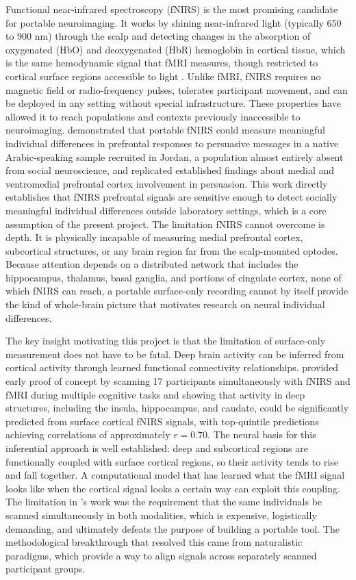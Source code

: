 Functional near-infrared spectroscopy (fNIRS) is the most promising candidate for
portable neuroimaging. It works by shining near-infrared light (typically 650 to 900 nm)
through the scalp and detecting changes in the absorption of oxygenated (HbO) and
deoxygenated (HbR) hemoglobin in cortical tissue, which is the same hemodynamic signal
that fMRI measures, though restricted to cortical surface regions accessible to light
\parencite{kamran2016}. Unlike fMRI, fNIRS requires no magnetic field or
radio-frequency pulses, tolerates participant movement, and can be deployed in any
setting without special infrastructure. These properties have allowed it to reach
populations and contexts previously inaccessible to neuroimaging. \textcite{burns2019}
demonstrated that portable fNIRS could measure meaningful individual differences in
prefrontal responses to persuasive messages in a native Arabic-speaking sample recruited
in Jordan, a population almost entirely absent from social neuroscience, and replicated
established findings about medial and ventromedial prefrontal cortex involvement in
persuasion. This work directly establishes that fNIRS prefrontal signals are sensitive
enough to detect socially meaningful individual differences outside laboratory settings,
which is a core assumption of the present project. The limitation fNIRS cannot overcome
is depth. It is physically incapable of measuring medial prefrontal cortex, subcortical
structures, or any brain region far from the scalp-mounted optodes. Because attention
depends on a distributed network that includes the hippocampus, thalamus, basal ganglia,
and portions of cingulate cortex, none of which fNIRS can reach, a portable surface-only
recording cannot by itself provide the kind of whole-brain picture that motivates
research on neural individual differences.

The key insight motivating this project is that the limitation of surface-only
measurement does not have to be fatal. Deep brain activity can be inferred from cortical
activity through learned functional connectivity relationships. \textcite{liu2015}
provided early proof of concept by scanning 17 participants simultaneously with fNIRS
and fMRI during multiple cognitive tasks and showing that activity in deep structures,
including the insula, hippocampus, and caudate, could be significantly predicted from
surface cortical fNIRS signals, with top-quintile predictions achieving correlations of
approximately $r = 0.70$. The neural basis for this inferential approach is well
established: deep and subcortical regions are functionally coupled with surface cortical
regions, so their activity tends to rise and fall together. A computational model that
has learned what the fMRI signal looks like when the cortical signal looks a certain way
can exploit this coupling. The limitation in \citeauthor{liu2015}'s work was the
requirement that the same individuals be scanned simultaneously in both modalities, which
is expensive, logistically demanding, and ultimately defeats the purpose of building a
portable tool. The methodological breakthrough that resolved this came from naturalistic
paradigms, which provide a way to align signals across separately scanned participant
groups.

